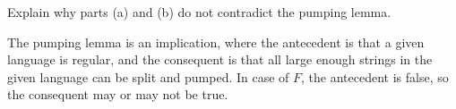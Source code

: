 \documentclass[11pt]{article}
\newenvironment{problem}[2][Problem]{\begin{trivlist}
\item[\hskip \labelsep {\bfseries #1}\hskip \labelsep {\bfseries #2.}]}{\end{trivlist}}
\begin{document}
\begin{problem}[Part]{c}
Explain why parts (a) and (b) do not contradict the pumping lemma.
\end{problem}
The pumping lemma is an implication, where the antecedent is that a given language is regular, and the consequent is that all large enough strings in the given language can be split and pumped. In case of $F$, the antecedent is false, so the consequent may or may not be true.
\end{document}
